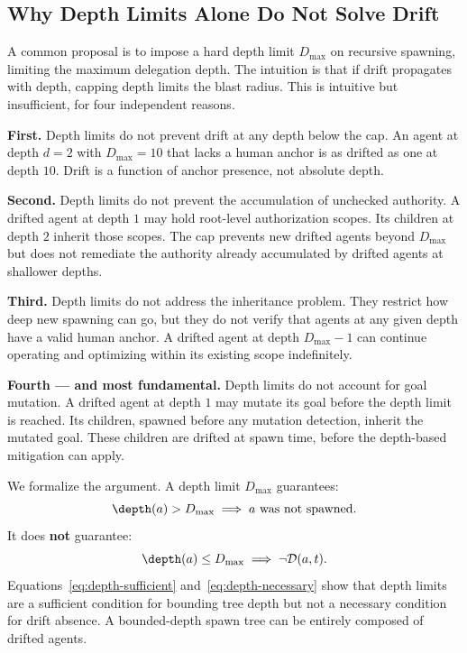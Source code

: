 \subsection{Why Depth Limits Alone Do Not Solve Drift}

A common proposal is to impose a hard depth limit $D_{\max}$ on recursive spawning, limiting the maximum delegation depth. The intuition is that if drift propagates with depth, capping depth limits the blast radius. This is intuitive but insufficient, for four independent reasons.

\textbf{First.} Depth limits do not prevent drift at any depth below the cap. An agent at depth $d = 2$ with $D_{\max} = 10$ that lacks a human anchor is as drifted as one at depth $10$. Drift is a function of anchor presence, not absolute depth.

\textbf{Second.} Depth limits do not prevent the accumulation of unchecked authority. A drifted agent at depth $1$ may hold root-level authorization scopes. Its children at depth $2$ inherit those scopes. The cap prevents new drifted agents beyond $D_{\max}$ but does not remediate the authority already accumulated by drifted agents at shallower depths.

\textbf{Third.} Depth limits do not address the inheritance problem. They restrict how deep new spawning can go, but they do not verify that agents at any given depth have a valid human anchor. A drifted agent at depth $D_{\max} - 1$ can continue operating and optimizing within its existing scope indefinitely.

\textbf{Fourth — and most fundamental.} Depth limits do not account for goal mutation. A drifted agent at depth $1$ may mutate its goal before the depth limit is reached. Its children, spawned before any mutation detection, inherit the mutated goal. These children are drifted at spawn time, before the depth-based mitigation can apply.

We formalize the argument. A depth limit $D_{\max}$ guarantees:
\begin{equation}
\depth(a) > D_{\max} \implies a \text{ was not spawned.}
\label{eq:depth-sufficient}
\end{equation}
It does \textbf{not} guarantee:
\begin{equation}
\depth(a) \leq D_{\max} \implies \neg \mathcal{D}(a, t).
\label{eq:depth-necessary}
\end{equation}
Equations~\eqref{eq:depth-sufficient} and~\eqref{eq:depth-necessary} show that depth limits are a sufficient condition for bounding tree depth but not a necessary condition for drift absence. A bounded-depth spawn tree can be entirely composed of drifted agents.


